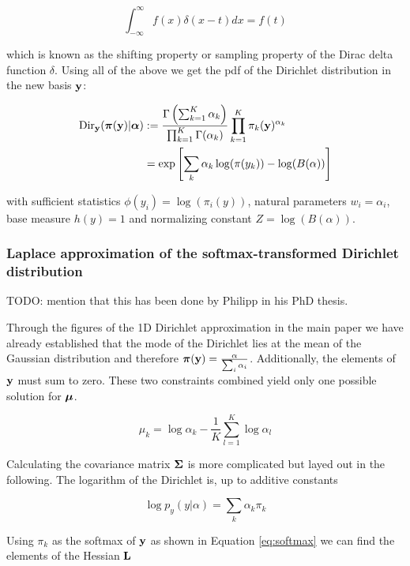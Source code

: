 \begin{equation}
	\int_{-\infty}^{\infty} f(x)\delta(x-t)dx = f(t)
\end{equation}

which is known as the shifting property or sampling property of the Dirac delta function $\delta$. Using all of the above we get the pdf of the Dirichlet distribution in the new basis $\mathbf{y}$: 

\begin{align}\label{eq:dirichlet_softmax}
\mathrm{Dir}_{\mathbf{y}}(\boldsymbol{\pi}(\mathbf{y}) | {\boldsymbol{\alpha}}) &:= \frac{\Gamma \left( \sum_{k=1}^K \alpha_k \right)}{\prod_{k=1}^K \Gamma(\alpha_k)} \prod_{k=1}^K \pi_k(\mathbf{y})^{\alpha_k}  \\
&= \exp\left[\sum_k\alpha_k\log(\pi(y_k)) - \log(B(\alpha))\right]
\end{align}

with sufficient statistics $\phi(y_i) = \log(\pi_i(y))$, natural parameters $w_i = \alpha_i$, base measure $h(y) = 1$ and normalizing constant $Z = \log(B(\alpha))$.

\subsubsection{Laplace approximation of the softmax-transformed Dirichlet distribution}

TODO: mention that this has been done by Philipp in his PhD thesis.

Through the figures of the 1D Dirichlet approximation in the main paper we have already established that the mode of the Dirichlet lies at the mean of the Gaussian distribution and therefore $\boldsymbol{\pi}(\mathbf{y}) = \frac{\mathbf{\alpha}}{\sum_i \alpha_i}$. Additionally, the elements of $\mathbf{y}$ must sum to zero. These two constraints combined yield only one possible solution for ${\boldsymbol{\mu}}$.

\begin{equation}
\mu_k = \log \alpha_k  - \frac{1}{K} \sum_{l=1}^{K} \log \alpha_l
\label{eq:mu_k}
\end{equation}

Calculating the covariance matrix ${\boldsymbol{\Sigma}}$ is more complicated but layed out in the following. The logarithm of the Dirichlet is, up to additive constants

\begin{equation}
\log p_y(y|\alpha) = \sum_k \alpha_k \pi_k 
\end{equation}

Using $\pi_k$ as the softmax of $\mathbf{y}$ as shown in Equation \ref{eq:softmax} we can find the elements of the Hessian ${\mathbf{L}}$

